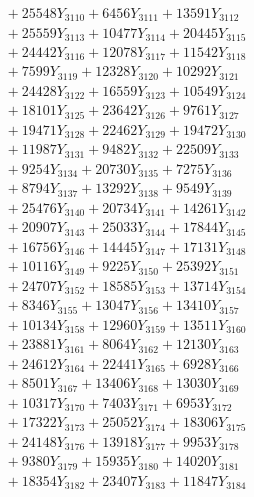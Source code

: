 \documentclass[a4paper,10pt]{article}
\begin{document}
{\begin{align}
&\;  + 25548 Y_{3110} + 6456 Y_{3111} + 13591 Y_{3112} \\[0.3ex]
&\;  + 25559 Y_{3113} + 10477 Y_{3114} + 20445 Y_{3115} \\[0.3ex]
&\;  + 24442 Y_{3116} + 12078 Y_{3117} + 11542 Y_{3118} \\[0.5ex]\allowbreak
&\;  + 7599 Y_{3119} + 12328 Y_{3120} + 10292 Y_{3121} \\[0.3ex]
&\;  + 24428 Y_{3122} + 16559 Y_{3123} + 10549 Y_{3124} \\[0.3ex]
&\;  + 18101 Y_{3125} + 23642 Y_{3126} + 9761 Y_{3127} \\[0.3ex]
&\;  + 19471 Y_{3128} + 22462 Y_{3129} + 19472 Y_{3130} \\[0.3ex]
&\;  + 11987 Y_{3131} + 9482 Y_{3132} + 22509 Y_{3133} \\[0.3ex]
&\;  + 9254 Y_{3134} + 20730 Y_{3135} + 7275 Y_{3136} \\[0.3ex]
&\;  + 8794 Y_{3137} + 13292 Y_{3138} + 9549 Y_{3139} \\[0.3ex]
&\;  + 25476 Y_{3140} + 20734 Y_{3141} + 14261 Y_{3142} \\[0.3ex]
&\;  + 20907 Y_{3143} + 25033 Y_{3144} + 17844 Y_{3145} \\[0.3ex]
&\;  + 16756 Y_{3146} + 14445 Y_{3147} + 17131 Y_{3148} \\[0.5ex]\allowbreak
&\;  + 10116 Y_{3149} + 9225 Y_{3150} + 25392 Y_{3151} \\[0.3ex]
&\;  + 24707 Y_{3152} + 18585 Y_{3153} + 13714 Y_{3154} \\[0.3ex]
&\;  + 8346 Y_{3155} + 13047 Y_{3156} + 13410 Y_{3157} \\[0.3ex]
&\;  + 10134 Y_{3158} + 12960 Y_{3159} + 13511 Y_{3160} \\[0.3ex]
&\;  + 23881 Y_{3161} + 8064 Y_{3162} + 12130 Y_{3163} \\[0.3ex]
&\;  + 24612 Y_{3164} + 22441 Y_{3165} + 6928 Y_{3166} \\[0.3ex]
&\;  + 8501 Y_{3167} + 13406 Y_{3168} + 13030 Y_{3169} \\[0.3ex]
&\;  + 10317 Y_{3170} + 7403 Y_{3171} + 6953 Y_{3172} \\[0.3ex]
&\;  + 17322 Y_{3173} + 25052 Y_{3174} + 18306 Y_{3175} \\[0.3ex]
&\;  + 24148 Y_{3176} + 13918 Y_{3177} + 9953 Y_{3178} \\[0.5ex]\allowbreak
&\;  + 9380 Y_{3179} + 15935 Y_{3180} + 14020 Y_{3181} \\[0.3ex]
&\;  + 18354 Y_{3182} + 23407 Y_{3183} + 11847 Y_{3184} \\[0.3ex]

\end{align}}
\end{document}
